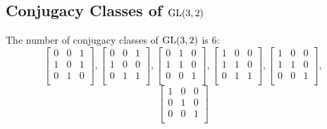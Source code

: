 \begin{mdframed}[style=MyFrame]
\section*{Conjugacy Classes of ${\rm GL}(3,2)$}
The number of conjugacy classes of ${\rm GL}(3,2)$ is 6:\\
$$
\left[
\begin{array}{*{3}{r}}
         0 &          0 &          1\\
         1 &          0 &          1\\
         0 &          1 &          0\\
\end{array}
\right]
, 
\left[
\begin{array}{*{3}{r}}
         0 &          0 &          1\\
         1 &          0 &          0\\
         0 &          1 &          1\\
\end{array}
\right]
, 
\left[
\begin{array}{*{3}{r}}
         0 &          1 &          0\\
         1 &          1 &          0\\
         0 &          0 &          1\\
\end{array}
\right]
, 
\left[
\begin{array}{*{3}{r}}
         1 &          0 &          0\\
         1 &          1 &          0\\
         0 &          1 &          1\\
\end{array}
\right]
, 
\left[
\begin{array}{*{3}{r}}
         1 &          0 &          0\\
         1 &          1 &          0\\
         0 &          0 &          1\\
\end{array}
\right]
, 
$$
$$
\left[
\begin{array}{*{3}{r}}
         1 &          0 &          0\\
         0 &          1 &          0\\
         0 &          0 &          1\\
\end{array}
\right]
$$
\end{mdframed}
